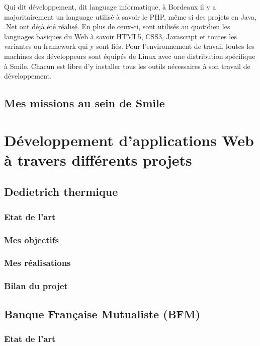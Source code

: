 \documentclass[a4paper,11pt,twoside]{report}
\begin{document}
  Qui dit développement, dit language informatique, à Bordeaux il y a majoritairement un language utilisé à savoir le PHP, même si des projets en Java, .Net ont déjà été réalisé. En plus de ceux-ci, sont utilisés au quotidien les languages basiques du Web à savoir HTML5, CSS3, Javascript et toutes les variantes ou framework qui y sont liés. Pour l'environnement de travail toutes les machines des développeurs sont équipés de Linux avec une distribution spécifique à Smile. Chacun est libre d'y installer tous les outils nécessaires à son travail de développement. 
  \section{Mes missions au sein de Smile}

\chapter{Développement d'applications Web à travers différents projets}
  \section{Dedietrich thermique}
    \subsection*{Etat de l'art}
    \subsection*{Mes objectifs}
    \subsection*{Mes réalisations}
    \subsection*{Bilan du projet}
  \section{Banque Française Mutualiste (BFM)}
    \subsection*{Etat de l'art}
\end{document}
